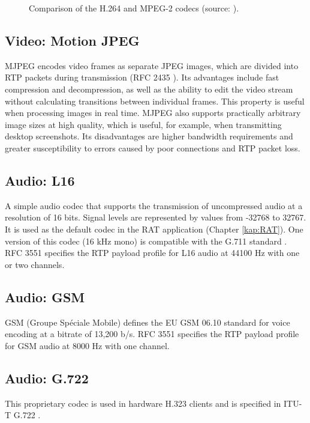 \begin{figure}[htp]
\centering

\caption{Comparison of the H.264 and MPEG-2 codecs (source: \protect\cite{Comparison-H264-H263-MPEG2}).}
\label{fig:Comparison-H264-MPEG2}
\end{figure}

\subsection{Video: Motion JPEG}\label{kap:MJPEG}
MJPEG encodes video frames as separate JPEG images, which are divided into RTP packets during transmission (RFC 2435 \cite{RFC-2435-RTP-Payload-Format-JPEG}). Its advantages include fast compression and decompression, as well as the ability to edit the video stream without calculating transitions between individual frames. This property is useful when processing images in real time. MJPEG also supports practically arbitrary image sizes at high quality, which is useful, for example, when transmitting desktop screenshots. Its disadvantages are higher bandwidth requirements and greater susceptibility to errors caused by poor connections and RTP packet loss.

\subsection{Audio: L16}\label{kap:L16}
A simple audio codec that supports the transmission of uncompressed audio at a resolution of 16 bits. Signal levels are represented by values from -32768 to 32767. It is used as the default codec in the RAT application (Chapter \ref{kap:RAT}). One version of this codec (16 kHz mono) is compatible with the G.711 standard \cite{ITU-G.711-PCM-of-voice}. RFC 3551 \cite{RFC-3551-RTP-Profile-AudioVideo} specifies the RTP payload profile for L16 audio at 44100 Hz with one or two channels.

\subsection{Audio: GSM}\label{kap:GSM}
GSM (Groupe Spéciale Mobile) defines the EU GSM 06.10 standard for voice encoding at a bitrate of 13,200 b/s. RFC 3551 \cite{RFC-3551-RTP-Profile-AudioVideo} specifies the RTP payload profile for GSM audio at 8000 Hz with one channel.

\subsection{Audio: G.722}\label{kap:G722}
This proprietary codec is used in hardware H.323 clients and is specified in ITU-T G.722 \cite{ITU-G.722-7KHz-Audio}.

